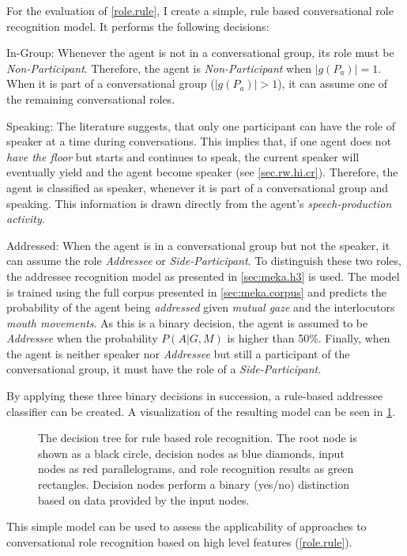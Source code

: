 For the evaluation of \cref{role.rule}, I create a simple, rule based \gls{conversational role} recognition model. 
It performs the following decisions:
\begin{description}
    \item{In-Group:} Whenever the agent is not in a \gls{conversational group}, its role must be \emph{Non-Participant}. 
    Therefore, the agent is \emph{Non-Participant} when \(|g(P_{a})|=1\).
    When it is part of a \gls{conversational group} (\(|g(P_{a})|>1\)), it can assume one of the remaining \glspl{conversational role}.
    \item{Speaking}: The literature suggests, that only one participant can have the role of \gls{speaker} at a time during \glspl{conversation}.
    This implies that, if one agent does not \emph{have the floor} but starts and continues to speak, the current \gls{speaker} will eventually yield and the agent become \gls{speaker} (see \vref{sec.rw.hi.cr}).
    Therefore, the agent is classified as \gls{speaker}, whenever it is part of a \gls{conversational group} and speaking.
    This information is drawn directly from the agent's \emph{speech-production activity}.
    \item{Addressed}: When the agent is in a \gls{conversational group} but not the \gls{speaker}, it can assume the role \emph{Addressee} or \emph{Side-Participant}.
    To distinguish these two roles, the \gls{addressee} recognition model as presented in \cref{sec:meka.h3} is used.
    The model is trained using the full corpus presented in \cref{sec:meka.corpus} and predicts the probability of the agent being \emph{addressed} given \emph{mutual gaze} and the interlocutors \emph{mouth movements}.
    As this is a binary decision, the agent is assumed to be \emph{Addressee} when the probability \(P(A|G,M)\) is higher than 50\%.
    Finally, when the agent is neither \gls{speaker} nor \emph{Addressee} but still a participant of the \gls{conversational group}, it must have the role of a \emph{Side-Participant}.
\end{description}
By applying these three binary decisions in succession, a rule-based \gls{addressee} classifier can be created.
A visualization of the resulting model can be seen in \cref{fig:role.rule}.
\begin{figure}[htb]
    \centering
    
    \caption[Rule based role recognition.]{\label{fig:role.rule} 
    The decision tree for rule based role recognition.
    The root node is shown as a black circle, decision nodes as blue diamonds, input nodes as red parallelograms, and role recognition results as green rectangles.
    Decision nodes perform a binary (yes/no) distinction based on data provided by the input nodes.
    }
\end{figure}
This simple model can be used to assess the applicability of approaches to \gls{conversational role} recognition based on high level features (\cref{role.rule}).

